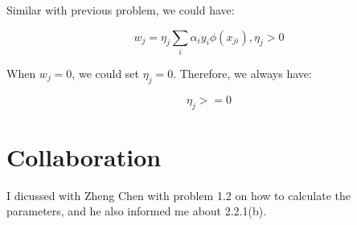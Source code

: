 \documentclass{article} %
\begin{document}
Similar with previous problem, we could have:

\begin{equation}
w_j = \eta_j \sum_i \alpha_i y_i \phi (x_{ji}), \eta_j > 0
\end{equation}

When $w_j = 0$, we could set $\eta_j = 0$. Therefore, we always have:

\begin{equation}
\eta_j >= 0
\end{equation}








\section{Collaboration}
I dicussed with Zheng Chen with problem 1.2 on how to calculate the parameters,
and he also informed me about 2.2.1(b).
\end{document}
